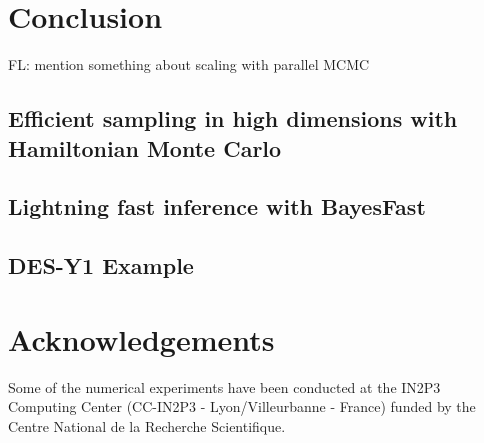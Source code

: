 \documentclass[final,5p,times,twocolumn,authoryear]{elsarticle}
\newcommand{\FL}[1]{{\color{cyan}FL: #1}}
\begin{document}
\section{Conclusion}

\FL{mention something about scaling with parallel MCMC}

\subsection{Efficient sampling in high dimensions with Hamiltonian Monte Carlo}



\subsection{Lightning fast inference with BayesFast}

%
%
\subsection{DES-Y1 Example}
%
\section*{Acknowledgements}
Some of the numerical experiments have been conducted at the IN2P3 Computing Center (CC-IN2P3 - Lyon/Villeurbanne - France) funded by the Centre National de la Recherche Scientifique.

\appendix
\end{document}
